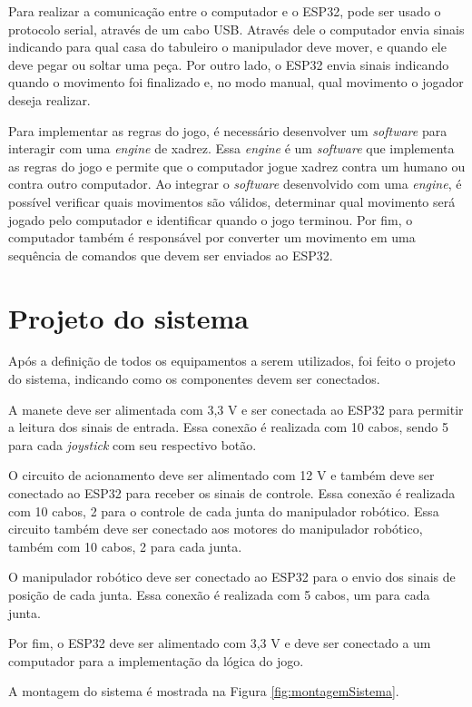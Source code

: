 Para realizar a comunicação entre o computador e o ESP32, pode ser usado o protocolo serial, através de um cabo USB.
Através dele o computador envia sinais indicando para qual casa do tabuleiro o manipulador deve mover, e quando ele deve pegar ou soltar uma peça.
Por outro lado, o ESP32 envia sinais indicando quando o movimento foi finalizado e, no modo manual, qual movimento o jogador deseja realizar.

Para implementar as regras do jogo, é necessário desenvolver um \textit{software} para interagir com uma \textit{engine} de xadrez.
Essa \textit{engine} é um \textit{software} que implementa as regras do jogo e permite que o computador jogue xadrez contra um humano ou contra outro computador.
Ao integrar o \textit{software} desenvolvido com uma \textit{engine}, é possível verificar quais movimentos são válidos, determinar qual movimento será jogado pelo computador e identificar quando o jogo terminou.
Por fim, o computador também é responsável por converter um movimento em uma sequência de comandos que devem ser enviados ao ESP32.

\section[Projeto do sistema]{Projeto do sistema}
\label{sec:projetoSistema}

Após a definição de todos os equipamentos a serem utilizados, foi feito o projeto do sistema,
indicando como os componentes devem ser conectados.

A manete deve ser alimentada com 3,3 V e ser conectada ao ESP32 para permitir a leitura dos sinais de entrada.
Essa conexão é realizada com 10 cabos, sendo 5 para cada \textit{joystick} com seu respectivo botão.

O circuito de acionamento deve ser alimentado com 12 V e também deve ser conectado ao ESP32 para receber os sinais de controle.
Essa conexão é realizada com 10 cabos, 2 para o controle de cada junta do manipulador robótico.
Essa circuito também deve ser conectado aos motores do manipulador robótico, também com 10 cabos, 2 para cada junta.

O manipulador robótico deve ser conectado ao ESP32 para o envio dos sinais de posição de cada junta.
Essa conexão é realizada com 5 cabos, um para cada junta.

Por fim, o ESP32 deve ser alimentado com 3,3 V e deve ser conectado a um computador para a implementação da lógica do jogo.

A montagem do sistema é mostrada na Figura \ref{fig:montagemSistema}.

